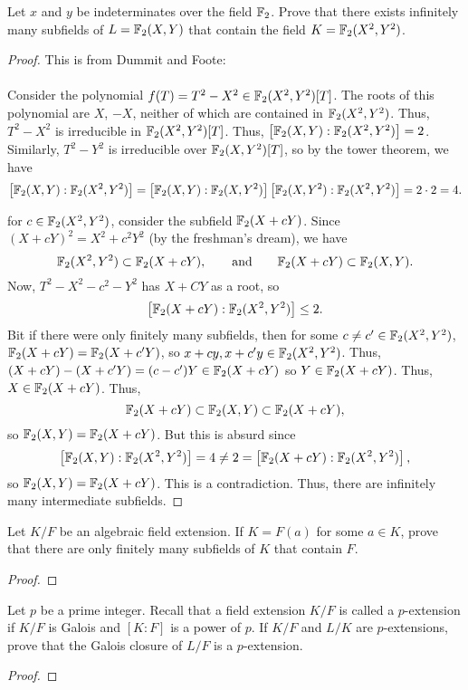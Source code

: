 \begin{problem}
Let $x$ and $y$ be indeterminates over the field $\mathbb{F}_2$. Prove that there
exists infinitely many subfields of $L=\mathbb{F}_2(X,Y)$ that contain the field
$K=\mathbb{F}_2(X^2,Y^2)$.
\end{problem}
\begin{proof}
This is from Dummit and Foote:
\\\\
Consider the polynomial $f(T)=T^2-X^2\in\mathbb{F}_2(X^2,Y^2)[T]$. The roots of
this polynomial are $X$, $-X$, neither of which are contained in
$\mathbb{F}_2(X^2,Y^2)$. Thus, $T^2-X^2$ is irreducible in
$\mathbb{F}_2(X^2,Y^2)[T]$. Thus,
$\left[\mathbb{F}_2(X,Y):\mathbb{F}_2(X^2,Y^2)\right]=2$. Similarly, $T^2-Y^2$ is
irreducible over $\mathbb{F}_2(X,Y^2)[T]$, so by the tower theorem, we have
\[
\left[\mathbb{F}_2(X,Y):\mathbb{F}_2(X^2,Y^2)\right]=\left[\mathbb{F}_2(X,Y):\mathbb{F}_2(X,Y^2)\right]\left[\mathbb{F}_2(X,Y^2):\mathbb{F}_2(X^2,Y^2)\right]=2\cdot 2=4.
\]

for $c\in\mathbb{F}_2(X^2,Y^2)$, consider the subfield $\mathbb{F}_2(X+cY)$. Since
$(X+cY)^2=X^2+c^2Y^2$ (by the freshman's dream), we have
\[
\mathbb{F}_2(X^2,Y^2)\subset\mathbb{F}_2(X+cY),\qquad\text{and}\qquad
\mathbb{F}_2(X+cY)\subset\mathbb{F}_2(X,Y).
\]
Now, $T^2-X^2-c^2-Y^2$ has $X+CY$ as a root, so
\[
\left[\mathbb{F}_2(X+cY):\mathbb{F}_2(X^2,Y^2)\right]\leq 2.
\]
Bit if there were only finitely many subfields, then for some $c\neq
c'\in\mathbb{F}_2(X^2,Y^2)$, $\mathbb{F}_2(X+cY)=\mathbb{F}_2(X+c'Y)$, so
$x+cy,x+c'y\in\mathbb{F}_2(X^2,Y^2)$. Thus,
$(X+cY)-(X+c'Y)=(c-c')Y\in\mathbb{F}_2(X+cY)$ so $Y\in\mathbb{F}_2(X+cY)$. Thus,
$X\in\mathbb{F}_2(X+cY)$. Thus,
\[
\mathbb{F}_2(X+cY)\subset\mathbb{F}_2(X,Y)\subset\mathbb{F}_2(X+cY),
\]
so $\mathbb{F}_2(X,Y)=\mathbb{F}_2(X+cY)$. But this is absurd since
\[
\left[\mathbb{F}_2(X,Y):\mathbb{F}_2(X^2,Y^2)\right]=4\neq 2=
\left[\mathbb{F}_2(X+cY):\mathbb{F}_2(X^2,Y^2)\right],
\]
so $\mathbb{F}_2(X,Y)=\mathbb{F}_2(X+cY)$. This is a contradiction. Thus, there are
infinitely many intermediate subfields.
\end{proof}

\begin{problem}
Let $K/F$ be an algebraic field extension. If $K=F(a)$ for some $a\in K$,
prove that there are only finitely many subfields of $K$ that contain $F$.
\end{problem}
\begin{proof}

\end{proof}

\begin{problem}
Let $p$ be a prime integer. Recall that a field extension $K/F$ is called a
$p$-extension if $K/F$ is Galois and $[K:F]$ is a power of $p$. If $K/F$
and $L/K$ are $p$-extensions, prove that the Galois closure of $L/F$ is a
$p$-extension.
\end{problem}
\begin{proof}
\end{proof}

